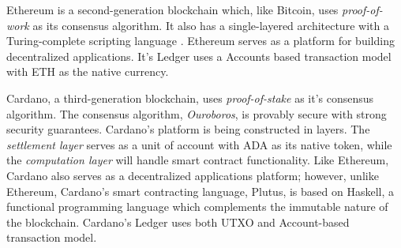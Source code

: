 		Ethereum\cite{buterin2014ethereum} is a second-generation blockchain which, like Bitcoin, uses \textit{proof-of-work} as its consensus algorithm. It also has a single-layered architecture with a Turing-complete scripting language \cite{github:solidity:1}. Ethereum serves as a platform for building decentralized applications. It's Ledger uses a Accounts based transaction model with ETH as the native currency.
		
		Cardano, a third-generation blockchain, uses \textit{proof-of-stake} as it's consensus algorithm. The consensus algorithm, \textit{Ouroboros}\cite{kiayias2017ouroboros}, is provably secure with strong security guarantees. Cardano's platform is being constructed in layers. The \textit{settlement layer} serves as a unit of account with ADA as its native token, while the \textit{computation layer} will handle smart contract functionality. Like Ethereum, Cardano also serves as a decentralized applications platform; however, unlike Ethereum, Cardano's smart contracting language, Plutus, is based on Haskell, a functional programming language which complements the immutable nature of the blockchain. Cardano's Ledger\cite{zahnentferner2018chimeric} uses both UTXO and Account-based transaction model.